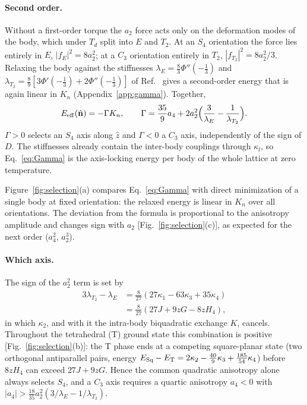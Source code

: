 \documentclass[pre,reprint,superscriptaddress,longbibliography,amsmath,amssymb,floatfix]{revtex4-2}
\newcommand{\nhat}{\hat{\mathbf n}}
\begin{document}
\paragraph*{Second order.} Without a first-order torque the $a_2$ force acts only on the deformation modes of the body, which under $T_d$ split into $E$ and $T_2$. At an $S_4$ orientation the force lies entirely in $E$, $|f_E|^2=8a_2^2$; at a $C_3$ orientation entirely in $T_2$, $|f_{T_2}|^2=8a_2^2/3$. Relaxing the body against the stiffnesses $\lambda_E=\frac83\Phi''(-\frac13)$ and $\lambda_{T_2}=\frac89[3\Phi'(-\frac13)+2\Phi''(-\frac13)]$ of Ref.~\cite{PaperI} gives a second-order energy that is again linear in $K_n$ (Appendix~\ref{app:gamma}). Together,
\begin{equation}
E_{\rm eff}(\nhat)=-\Gamma K_n,\qquad
\Gamma=\frac{35}{9}a_4+2a_2^2\Big(\frac{3}{\lambda_E}-\frac{1}{\lambda_{T_2}}\Big).
\label{eq:Gamma}
\end{equation}
$\Gamma>0$ selects an $S_4$ axis along $\hat z$ and $\Gamma<0$ a $C_3$ axis, independently of the sign of $D$. The stiffnesses already contain the inter-body couplings through $\kappa_l$, so Eq.~\eqref{eq:Gamma} is the axis-locking energy per body of the whole lattice at zero temperature.

Figure~\ref{fig:selection}(a) compares Eq.~\eqref{eq:Gamma} with direct minimization of a single body at fixed orientation: the relaxed energy is linear in $K_n$ over all orientations. The deviation from the formula is proportional to the anisotropy amplitude and changes sign with $a_2$ [Fig.~\ref{fig:selection}(c)], as expected for the next order ($a_4^2$, $a_2^3$).

\paragraph*{Which axis.} The sign of the $a_2^2$ term is set by
\begin{align}
3\lambda_{T_2}-\lambda_E&=\tfrac{8}{27}(27\kappa_1-63\kappa_3+35\kappa_4)\nonumber\\
&=\tfrac{8}{27}(27J+9zG-8zH_4),
\label{eq:criterion}
\end{align}
in which $\kappa_2$, and with it the intra-body biquadratic exchange $K$, cancels. Throughout the tetrahedral (T) ground state this combination is positive [Fig.~\ref{fig:selection}(b)]: the T phase ends at a competing square-planar state (two orthogonal antiparallel pairs, energy $E_{\rm Sq}-E_{\rm T}=2\kappa_2-\frac{40}{9}\kappa_3+\frac{185}{54}\kappa_4$) before $8zH_4$ can exceed $27J+9zG$. Hence the common quadratic anisotropy alone always selects $S_4$, and a $C_3$ axis requires a quartic anisotropy $a_4<0$ with $|a_4|>\frac{18}{35}a_2^2(3/\lambda_E-1/\lambda_{T_2})$.
\end{document}
